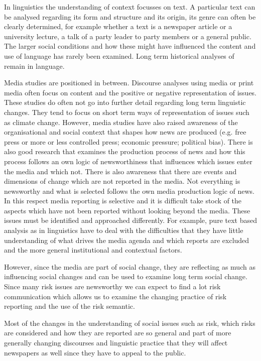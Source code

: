 In linguistics the understanding of context focusses on text. A particular text can be analysed regarding its form and structure and its origin, its genre can often be clearly determined, for example whether a text is a newspaper article or a university lecture, a talk of a party leader to party members or a general public. The larger social conditions and how these might have influenced the content and use of language has rarely been examined. Long term historical analyses of remain in language. 

Media studies are positioned in between. Discourse analyses using media or print media often focus on content and the positive or negative representation of issues. These studies do often not go into further detail regarding long term linguistic changes. They tend to focus on short term ways of representation of issues such as climate change. However, media studies have also raised awareness of the organisational and social context that shapes how news are produced (e.g. free press or more or less controlled press; economic pressure; political bias). There is also good research that examines the production process of news and how this process follows an own logic of newsworthiness that influences which issues enter the media and which not. There is also awareness that there are events and dimensions of change which are not reported in the media. Not everything is newsworthy and what is selected follows the own media production logic of news. In this respect media reporting is selective and it is difficult take stock of the aspects which have not been reported without looking beyond the media. These issues must be identified and approached differently. For example, pure text based analysis as in linguistics have to deal with the difficulties that they have little understanding of what drives the media agenda and which reports are excluded and the more general institutional and contextual factors.

However, since the media are part of social change, they are reflecting as much as influencing social changes and can be used to examine long term social change. Since many risk issues are newsworthy we can expect to find a lot risk communication which allows us to examine the changing practice of risk reporting and the use of the risk semantic.

Most of the changes in the understanding of social issues such as risk, which risks are considered and how they are reported are so general and part of more generally changing discourses and linguistic practice that they will affect newspapers as well since they have to appeal to the public.

